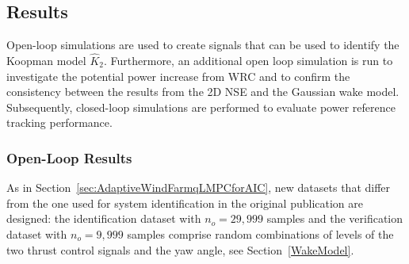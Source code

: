 \subsection{Results} \label{SimResults}
Open-loop simulations are used to create signals that can be used to identify the Koopman model $\hat{K}_2$. Furthermore, an additional open loop simulation is run to investigate the potential power increase from WRC and to confirm the consistency between the results from the 2D NSE and the Gaussian wake model. Subsequently, closed-loop simulations are performed to evaluate power reference tracking performance.


\subsubsection{Open-Loop Results}
As in Section~\ref{sec:AdaptiveWindFarmqLMPCforAIC}, new datasets that differ from the one used for system identification in the original publication \cite{dittmer2023koopman} are designed: the identification dataset with $n_o = 29,999$ samples and the verification dataset with $n_o = 9,999$ samples comprise random combinations of levels of the two thrust control signals and the yaw angle, see Section~\ref{WakeModel}.

